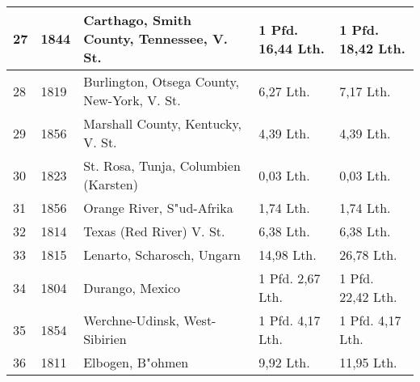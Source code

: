 \documentclass[a4paper, 11pt, oneside]{article}
\begin{document}
\begin{center}
\begin{footnotesize}
\begin{tabular}{ |p{7mm}|p{9mm}|p{45mm}|p{24mm}|p{24mm}| }
    27 & 1844 & Carthago, Smith County, Tennessee, V. St. & 1 Pfd. 16,44 Lth. & 1 Pfd. 18,42 Lth.\\\hline
    28 & 1819 & Burlington, Otsega County, New-York, V. St. & 6,27 Lth. & 7,17 Lth.\\\hline
    29 & 1856 & Marshall County, Kentucky, V. St. & 4,39 Lth. & 4,39 Lth.\\\hline
    30 & 1823 & St. Rosa, Tunja, Columbien (Karsten) & 0,03 Lth. & 0,03 Lth.\\\hline
    31 & 1856 & Orange River, S"ud-Afrika & 1,74 Lth. & 1,74 Lth.\\\hline
    32 & 1814 & Texas (Red River) V. St. & 6,38 Lth. & 6,38 Lth.\\\hline
    33 & 1815 & Lenarto, Scharosch, Ungarn & 14,98 Lth. & 26,78 Lth.\\\hline
    34 & 1804 & Durango, Mexico & 1 Pfd. 2,67 Lth. & 1 Pfd. 22,42 Lth.\\\hline
    35 & 1854 & Werchne-Udinsk, West-Sibirien & 1 Pfd. 4,17 Lth. & 1 Pfd. 4,17 Lth.\\\hline
    36 & 1811 & Elbogen, B"ohmen & 9,92 Lth. & 11,95 Lth.\\
    \hline
\end{tabular}
\end{footnotesize}
\end{center}
\end{document}
